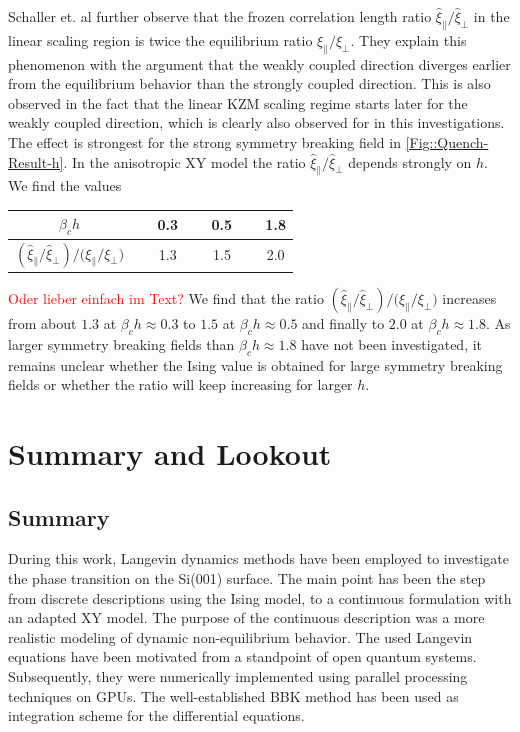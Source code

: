 	Schaller et. al further observe that the frozen correlation length ratio $\hat{\xi}_\parallel / \hat{\xi}_\perp$ in the linear scaling region is twice the equilibrium ratio $\xi_\parallel / \xi_\perp$. They explain this phenomenon with the argument that the weakly coupled direction diverges earlier from the equilibrium behavior than the strongly coupled direction. This is also observed in the fact that the linear KZM scaling regime starts later for the weakly coupled direction, which is clearly also observed for in this investigations. The effect is strongest for the strong symmetry breaking field in \autoref{Fig::Quench-Result-h}. In the anisotropic XY model the ratio $\hat{\xi}_\parallel / \hat{\xi}_\perp$ depends strongly on $h$. We find the values
	\begin{table}[h]
	\centering
	\begin{tabular}{c | c c c}
		$\beta_c h$  & $\quad$ 0.3 $\quad$ & 0.5 $\quad$ & 1.8\\
		\midrule
		$ \left({\hat{\xi}_\parallel}/{\hat{\xi}_\perp}\right) \Big / \Big({{\xi}_\parallel} /	{{\xi}_\perp}\Big) $ & 1.3 & 1.5 $\quad$ & 2.0 \\
		\end{tabular}
		\label{Table::frozen-corr-length-ratio}
	\end{table}
	\textcolor{red}{Oder lieber einfach im Text?} We find that the ratio $ \left({\hat{\xi}_\parallel}/{\hat{\xi}_\perp}\right) \Big / \Big({{\xi}_\parallel} / {{\xi}_\perp}\Big) $ increases from about $1.3$ at $\beta_c h \approx	0.3$ to $1.5$ at $\beta_c h \approx	0.5$ and finally to $2.0$ at $\beta_c h \approx	1.8$. As larger symmetry breaking fields than $\beta_c h \approx	1.8$ have not been investigated, it remains unclear whether the Ising value is obtained for large symmetry breaking fields or whether the ratio will keep increasing for larger $h$.
	\chapter{Summary and Lookout} \label{Chapter::Summary-Lookout}
	\section{Summary}
	During this work, Langevin dynamics methods have been employed to investigate the phase transition on the Si(001) surface. The main point has been the step from discrete descriptions using the Ising model, to a continuous formulation with an adapted XY model. The purpose of the continuous description was a more realistic modeling of dynamic non-equilibrium behavior. The used Langevin equations have been motivated from a standpoint of open quantum systems. Subsequently, they were  numerically implemented using parallel processing techniques on GPUs. The well-established BBK method has been used as integration scheme for the differential equations. \\
	
